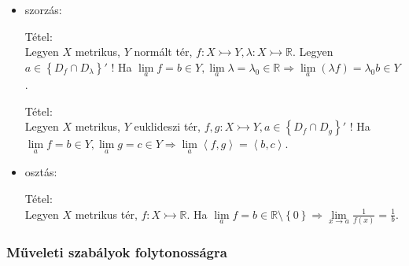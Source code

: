 \documentclass[12pt,a4paper]{scrartcl}
\providecommand{\tightlist}{%
  \setlength{\itemsep}{0pt}\setlength{\parskip}{0pt}}
\newenvironment{tetel}{}{}
\begin{document}
\begin{itemize}
\tightlist
\item
  szorzás:

  \begin{tetel}

  Tétel:\\
  Legyen \(X\) metrikus, \(Y\) normált tér,
  \(\left. f:X\rightarrowtail Y,\lambda:X\rightarrowtail{\mathbb{R}} \right.\).
  Legyen \(a \in \left\{ {D_{f} \cap D_{\lambda}} \right\}'\) ! Ha
  \(\left. \underset{a}{\lim}f = b \in Y,\underset{a}{\lim}\lambda = \lambda_{0} \in {\mathbb{R}}\Rightarrow\underset{a}{\lim}\left( {\lambda f} \right) = \lambda_{0}b \in Y \right.\).

  \end{tetel}

  \begin{tetel}

  Tétel:\\
  Legyen \(X\) metrikus, \(Y\) euklideszi tér,
  \(\left. f,g:X\rightarrowtail Y,a \in \left\{ {D_{f} \cap D_{g}} \right\}' \right.\)
  ! Ha
  \(\left. \underset{a}{\lim}f = b \in Y,\underset{a}{\lim}g = c \in Y\Rightarrow\underset{a}{\lim}\left\langle {f,g} \right\rangle = \left\langle {b,c} \right\rangle \right.\).

  \end{tetel}
\end{itemize}

\begin{itemize}
\tightlist
\item
  osztás:

  \begin{tetel}

  Tétel:\\
  Legyen \(X\) metrikus tér,
  \(\left. f:X\rightarrowtail{\mathbb{R}} \right.\). Ha
  \(\left. \underset{a}{\lim}f = b \in {\mathbb{R}}\text{\textbackslash}\left\{ 0 \right\}\Rightarrow\underset{x\rightarrow a}{\lim}\frac{1}{f\left( x \right)} = \frac{1}{b} \right.\).

  \end{tetel}
\end{itemize}

\hypertarget{mux171veleti-szabuxe1lyok-folytonossuxe1gra}{%
\subsubsection{Műveleti szabályok
folytonosságra}\label{mux171veleti-szabuxe1lyok-folytonossuxe1gra}}
\end{document}
